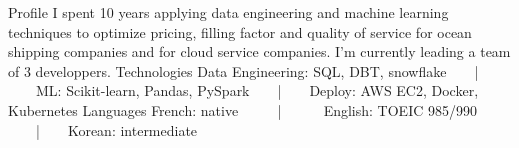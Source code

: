 
\begin{cvskills}

  \cvskill
    {Profile} %
    {I spent 10 years applying data engineering and machine learning techniques to optimize pricing, filling factor and quality of service for ocean shipping companies and for cloud service companies. I'm currently leading a team of 3 developpers.} %
  \cvskill
    {Technologies} %
    {Data Engineering: SQL, DBT, snowflake~~~~|~~~~ML: Scikit-learn, Pandas, PySpark~~~~|~~~~Deploy: AWS EC2, Docker, Kubernetes} %
  \cvskill
    {Languages} %
	{French: native ~~~~~|~~~~~~English: TOEIC 985/990 ~~~~|~~~~Korean: intermediate} %
\end{cvskills}
